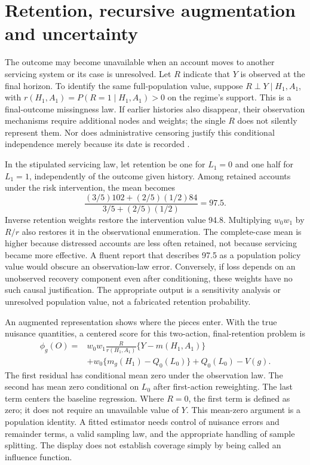 \section{Retention, recursive augmentation and uncertainty}
\label{exec14:l5-retention}

The outcome may become unavailable when an account moves to another servicing
system or its case is unresolved. Let $R$ indicate that $Y$ is observed at the
final horizon. To identify the same full-population value, suppose
$R\perp Y\mid H_1,A_1$, with
$r(H_1,A_1)=P(R=1\mid H_1,A_1)>0$ on the regime's support. This is a final-outcome
missingness law. If earlier histories also disappear, their observation
mechanisms require additional nodes and weights; the single $R$ does not
silently represent them. Nor does administrative censoring justify this
conditional independence merely because its date is recorded
\citep{hernan2020}.

In the stipulated servicing law, let retention be one for $L_1=0$ and one half
for $L_1=1$, independently of the outcome given history. Among retained accounts
under the risk intervention, the mean becomes
\[
 \frac{(3/5)102+(2/5)(1/2)84}{3/5+(2/5)(1/2)}=97.5.
\]
Inverse retention weights restore the intervention value 94.8. Multiplying
$w_0w_1$ by $R/r$ also restores it in the observational enumeration. The
complete-case mean is higher because distressed accounts are less often
retained, not because servicing became more effective. A fluent report that
describes 97.5 as a population policy value would obscure an observation-law
error. Conversely, if loss depends on an unobserved recovery component even
after conditioning, these weights have no such causal justification. The
appropriate output is a sensitivity analysis or unresolved population value,
not a fabricated retention probability.

An augmented representation shows where the pieces enter. With the true
nuisance quantities, a centered score for this two-action, final-retention
problem is
\begin{align}
 \phi_g(O)={}&w_0w_1\frac{R}{r(H_1,A_1)}
          \{Y-m(H_1,A_1)\}\nonumber\\
 &+w_0\{m_g(H_1)-Q_0(L_0)\}+Q_0(L_0)-V(g).
 \label{eq:exec14-l5-score}
\end{align}
The first residual has conditional mean zero under the observation law. The
second has mean zero conditional on $L_0$ after first-action reweighting.
The last term centers the baseline regression. Where $R=0$, the first term
is defined as zero; it does not require an unavailable value of $Y$. This
mean-zero argument is a population identity. A fitted estimator needs control
of nuisance errors and remainder terms, a valid sampling law, and the
appropriate handling of sample splitting. The display does not establish
coverage simply by being called an influence function.

